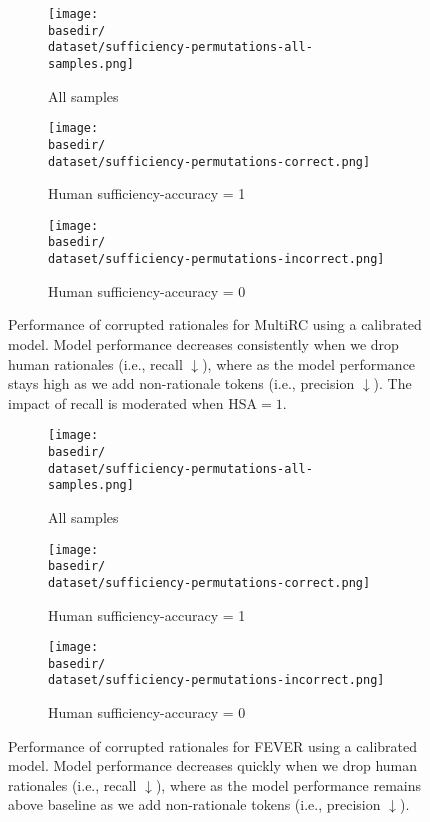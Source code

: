 \def \dataset {multirc-cal}
\def \basedir {new_plots}
\begin{figure*}[h]
\centering
\begin{subfigure}[t]{0.41\textwidth}
    \centering
    \texttt{[image: \\basedir/\\dataset/sufficiency-permutations-all-samples.png]}
    \caption{All samples}
    \label{fig:multirc_cal_perturbation_plots_all}
\end{subfigure}
\begin{subfigure}[t]{0.28\textwidth}
    \centering
    \texttt{[image: \\basedir/\\dataset/sufficiency-permutations-correct.png]}
    \caption{Human sufficiency-accuracy = 1}
    \label{fig:multirc_cal_perturbation_plots_suffacc_1}
\end{subfigure}
\begin{subfigure}[t]{0.28\textwidth}
    \centering
    \texttt{[image: \\basedir/\\dataset/sufficiency-permutations-incorrect.png]}
    \caption{Human sufficiency-accuracy = 0}
    \label{fig:multirc_cal_perturbation_plots_suffacc_0}
\end{subfigure}
\caption{Performance of corrupted rationales for MultiRC using a calibrated model.
Model performance decreases consistently when we drop human rationales (i.e., recall $\downarrow$), where as the model performance stays high as we add non-rationale tokens (i.e., precision $\downarrow$).
The impact of recall is moderated when HSA$=1$.}
\label{fig:multirc_cal_perturbation_plots}
\end{figure*}




\def \dataset {fever-cal}
\def \basedir {new_plots}
\begin{figure*}[h]
\centering
\begin{subfigure}[t]{0.41\textwidth}
    \centering
    \texttt{[image: \\basedir/\\dataset/sufficiency-permutations-all-samples.png]}
    \caption{All samples}
    \label{fig:fever_cal_perturbation_plots_all}
\end{subfigure}
\begin{subfigure}[t]{0.28\textwidth}
    \centering
    \texttt{[image: \\basedir/\\dataset/sufficiency-permutations-correct.png]}
    \caption{Human sufficiency-accuracy = 1}
    \label{fig:fever_cal_perturbation_plots_suffacc_1}
\end{subfigure}
\begin{subfigure}[t]{0.28\textwidth}
    \centering
    \texttt{[image: \\basedir/\\dataset/sufficiency-permutations-incorrect.png]}
    \caption{Human sufficiency-accuracy = 0}
    \label{fig:fever_cal_perturbation_plots_suffacc_0}
\end{subfigure}
\caption{Performance of corrupted rationales for FEVER using a calibrated model.
Model performance decreases quickly when we drop human rationales (i.e., recall $\downarrow$), where as the model performance remains above baseline as we add non-rationale tokens (i.e., precision $\downarrow$).}
\label{fig:fever_cal_perturbation_plots}
\end{figure*}

